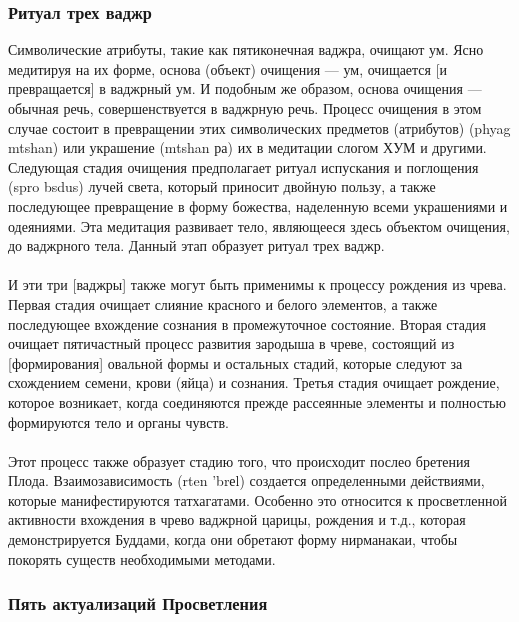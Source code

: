 \subsubsection{Ритуал трех ваджр}

Символические атрибуты, такие как пятиконечная ваджра, очищают ум. Ясно медитируя
на их форме, основа (объект) очищения — ум, очищается [и превращается] в ваджрный ум.
И подобным же образом, основа очищения — обычная речь, совершенствуется в ваджрную речь.
Процесс очищения в этом случае состоит в превращении этих символических предметов
(атрибутов) (phyag mtshan) или украшение (mtshan ра) их в медитации слогом ХУМ и
другими. Следующая стадия очищения предполагает ритуал испускания и поглощения (spro
bsdus) лучей света, который приносит двойную пользу, а также последующее превращение в
форму божества, наделенную всеми украшениями и одеяниями. Эта медитация развивает
тело, являющееся здесь объектом очищения, до ваджрного тела. Данный этап образует
ритуал трех ваджр.\\
\\
И эти три [ваджры] также могут быть применимы к процессу рождения из чрева. Первая
стадия очищает слияние красного и белого элементов, а также последующее вхождение
сознания в промежуточное состояние. Вторая стадия очищает пятичастный процесс развития
зародыша в чреве, состоящий из [формирования] овальной формы и остальных стадий,
которые следуют за схождением семени, крови (яйца) и сознания. Третья стадия очищает
рождение, которое возникает, когда соединяются прежде рассеянные элементы и полностью
формируются тело и органы чувств.\\
\\
Этот процесс также образует стадию того, что происходит послео бретения Плода.
Взаимозависимость (rten 'brеl) создается определенными действиями, которые
манифестируются татхагатами. Особенно это относится к просветленной активности
вхождения в чрево ваджрной царицы, рождения и т.д., которая демонстрируется Буддами,
когда они обретают форму нирманакаи, чтобы покорять существ необходимыми методами.

\subsubsection{Пять актуализаций Просветления}

